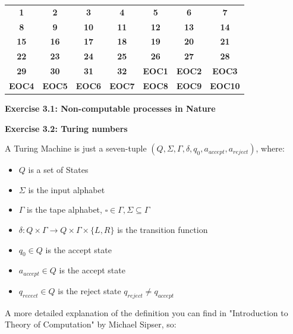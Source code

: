 \documentclass{article}
\newcommand{\solved}[1]{\colorbox{green!30}{\textbf{#1}}}
\newcommand{\inProgress}[1]{\colorbox{yellow!30}{\textbf{#1}}}
\newcommand{\notStarted}[1]{\colorbox{red!30}{\textbf{#1}}}
\begin{document}
\begin{center}
\begin{tabular}{*{7}{c}}
\toprule
\notStarted{1} & \solved{2} & \notStarted{3} & \inProgress{4} & \notStarted{5} & \notStarted{6} & \notStarted{7} \\
\notStarted{8} & \notStarted{9} & \notStarted{10} & \solved{11} & \solved{12} & \notStarted{13} & \notStarted{14} \\
\notStarted{15} & \notStarted{16} & \notStarted{17} & \notStarted{18} & \notStarted{19} & \notStarted{20} & \notStarted{21} \\
\notStarted{22} & \notStarted{23} & \notStarted{24} & \notStarted{25} & \notStarted{26} & \notStarted{27} & \notStarted{28} \\
\notStarted{29} & \notStarted{30} & \notStarted{31} & \notStarted{32} & \notStarted{EOC1} & \notStarted{EOC2} & \notStarted{EOC3} \\
\notStarted{EOC4} & \notStarted{EOC5} & \notStarted{EOC6} & \notStarted{EOC7} & \notStarted{EOC8} & \notStarted{EOC9} & \notStarted{EOC10} \\
\bottomrule
\end{tabular}
\end{center}

\bigskip

\begin{framed}
    \noindent \textbf{Exercise 3.1: Non-computable processes in Nature}
    
    \medskip
    
    
\end{framed}

\bigskip

\begin{framed}
    \noindent \textbf{Exercise 3.2: Turing numbers}
    
    \medskip
    A Turing Machine is just a seven-tuple $(Q, \Sigma, \Gamma, \delta, q_0, a_{accept}, a_{reject})$, where:
    \begin{itemize}
        \item $Q$ is a set of States
        \item $\Sigma$ is the input alphabet 
        \item $\Gamma$ is the tape alphabet, $\square \in \Gamma, \Sigma \subseteq \Gamma$
        \item $\delta: Q \times \Gamma \rightarrow Q \times \Gamma \times \{L,R\}$ is the transition function
        \item  $q_0 \in Q$ is the accept state
        \item $a_{accept} \in Q$ is the accept state
        \item $q_{recect} \in Q$ is the reject state $q_{reject} \neq q_{accept}$
    \end{itemize}
A more detailed explanation of the definition you can find in "Introduction to Theory of Computation" by Michael Sipser, so:
\end{framed}
\end{document}
